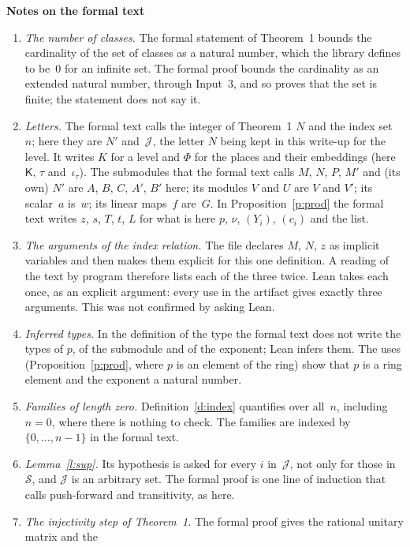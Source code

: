 \documentclass[11pt,a4paper]{article}
\newcommand{\m}[1]{\mbox{$#1$}}        %
\newcommand{\sect}[2]{\refstepcounter{section}\label{#2}\par\addvspace{19pt plus 4pt minus 2pt}\Needspace{7\baselineskip}%
  \noindent\llap{{\fontsize{13.2}{16}\selectfont\bfseries\color{inkfaint}\thesection}\hspace{9pt}}%
  {\fontsize{13.2}{16}\selectfont\bfseries\color{ink}#1}\par\nopagebreak\vspace{-1pt}}
\theoremstyle{plainx}
\theoremstyle{uprightx}
\newcommand{\cJ}{\mathcal{J}}
\newcommand{\cS}{\mathcal{S}}
\begin{document}
\sect{Notes on the formal text}{s:notes}
\begin{enumerate}[label=\textup{\arabic*.},leftmargin=1.6em,itemsep=5pt]
\item \emph{The number of classes.} The formal statement of Theorem~1 bounds the cardinality of the set of
classes as a natural number, which the library defines to be~$0$ for an infinite set. The formal proof bounds
the cardinality as an extended natural number, through Input~3, and so proves that the set is finite; the
statement does not say it.
\item \emph{Letters.} The formal text calls the integer of Theorem~1 $N$ and the index set~$n$; here they are $N'$
and~$\cJ$, the letter $N$ being kept in this write-up for the level. It writes $K$ for a level and $\Phi$ for the
places and their embeddings (here $\mathsf{K}$, $\tau$ and~\m{\iota_{\tau}}). The submodules that the formal text
calls $M$, $N$, $P$, $M'$ and (its own) $N'$ are $A$, $B$, $C$, $A'$, $B'$ here; its modules $V$ and $U$ are $V$ and $V'$; its scalar~$a$
is~$w$; its linear maps~$f$ are~$G$. In Proposition~\ref{p:prod} the formal text writes $z$, $s$, $T$, $t$, $L$ for
what is here $p$, $\nu$, \m{(Y_i)}, \m{(c_i)} and the list.
\item \emph{The arguments of the index relation.} The file declares $M$, $N$, $z$ as implicit variables and then
makes them explicit for this one definition. A reading of the text by program therefore lists each of the three
twice. Lean takes each once, as an explicit argument: every use in the artifact gives exactly three arguments.
This was not confirmed by asking Lean.
\item \emph{Inferred types.} In the definition of the type the formal text does not write the types of $p$, of the
submodule and of the exponent; Lean infers them. The uses (Proposition~\ref{p:prod}, where $p$ is an element
of the ring) show that $p$ is a ring element and the exponent a natural number.
\item \emph{Families of length zero.} Definition~\ref{d:index} quantifies over all~$n$, including \m{n=0}, where
there is nothing to check. The families are indexed by \m{\{0,\dots,n-1\}} in the formal text.
\item \emph{Lemma~\ref{l:sup}.} Its hypothesis is asked for every $i$ in~$\cJ$, not only for those in~$\cS$, and
$\cJ$ is an arbitrary set. The formal proof is one line of induction that calls push-forward and transitivity,
as here.
\item \emph{The injectivity step of Theorem~1.} The formal proof gives the rational unitary matrix and the

\end{enumerate}
\end{document}
